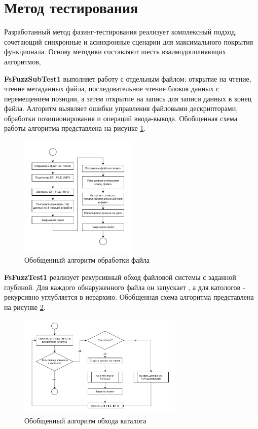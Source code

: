\section{Метод тестирования}

Разработанный метод фазинг-тестирования реализует комплексный подход, сочетающий синхронные и асинхронные сценарии для максимального покрытия функционала. Основу методики составляют шесть взаимодополняющих алгоритмов,

\textbf{FsFuzzSubTest1} выполняет работу с отдельным файлом: открытие на чтение, чтение метаданных файла, последовательное чтение блоков данных с перемещением позиции, а затем открытие на запись для записи данных в конец файла. Алгоритм выявляет ошибки управления файловыми дескрипторами, обработки позиционирования и операций ввода-вывода. Обобщенная схема работы алгоритма представлена на рисунке \ref{met:pic:fsfuzzsubtesti}.
\begin{figure}[htbp]
	\centering %
	\includegraphics[width=0.5\textwidth]{FsFuzzSubtestI.pdf} %
	\caption{Обобщенный алгоритм обработки файла } %
	\label{met:pic:fsfuzzsubtesti} %
\end{figure}

\newpage
\textbf{FsFuzzTest1} реализует рекурсивный обход файловой системы с заданной глубиной. Для каждого обнаруженного файла он запускает , а для катологов - рекурсивно углубляется в иерархию. Обобщенная схема алгоритма представлена на рисунке \ref{met:pic:fsfuzztesti}.
\begin{figure}[htbp]
	\centering %
	\includegraphics[width=0.7\textwidth]{FsFuzzTestI.pdf} %
	\caption{Обобщенный алгоритм обхода каталога} %
	\label{met:pic:fsfuzztesti} %
\end{figure}

